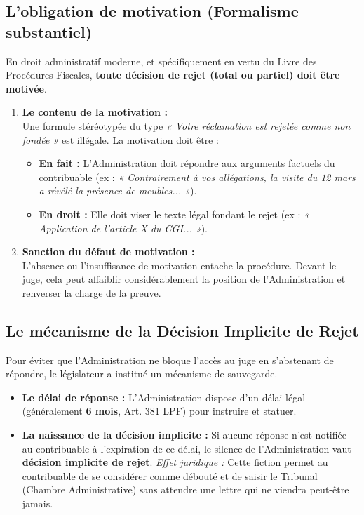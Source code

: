 \documentclass[Cours_contentieuxTF2026.tex]{subfiles}
\begin{document}
\subsection{L'obligation de motivation (Formalisme substantiel)}

En droit administratif moderne, et spécifiquement en vertu du Livre des Procédures Fiscales, \textbf{toute décision de rejet (total ou partiel) doit être motivée}.

\begin{enumerate}
	\item \textbf{Le contenu de la motivation :} \\
	Une formule stéréotypée du type \textit{« Votre réclamation est rejetée comme non fondée »} est illégale. La motivation doit être :
	\begin{itemize}
		\item \textbf{En fait :} L'Administration doit répondre aux arguments factuels du contribuable (ex : \textit{« Contrairement à vos allégations, la visite du 12 mars a révélé la présence de meubles... »}).
		\item \textbf{En droit :} Elle doit viser le texte légal fondant le rejet (ex : \textit{« Application de l'article X du CGI... »}).
	\end{itemize}
	
	\item \textbf{Sanction du défaut de motivation :} \\
	L'absence ou l'insuffisance de motivation entache la procédure. Devant le juge, cela peut affaiblir considérablement la position de l'Administration et renverser la charge de la preuve.
\end{enumerate}

\subsection{Le mécanisme de la Décision Implicite de Rejet}

Pour éviter que l'Administration ne bloque l'accès au juge en s'abstenant de répondre, le législateur a institué un mécanisme de sauvegarde.

\begin{itemize}
	\item \textbf{Le délai de réponse :} L'Administration dispose d'un délai légal (généralement \textbf{6 mois}, Art. 381 LPF) pour instruire et statuer.
	
	\item \textbf{La naissance de la décision implicite :} Si aucune réponse n'est notifiée au contribuable à l'expiration de ce délai, le silence de l'Administration vaut \textbf{décision implicite de rejet}.
	\textit{Effet juridique :} Cette fiction permet au contribuable de se considérer comme débouté et de saisir le Tribunal (Chambre Administrative) sans attendre une lettre qui ne viendra peut-être jamais.
\end{itemize}
\end{document}
